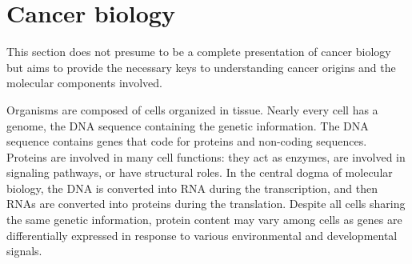 \documentclass[../main.tex]{subfiles}
\begin{document}
\section{Cancer biology}
	This section does not presume to be a complete presentation of cancer biology but aims to provide the necessary keys to understanding cancer origins and the molecular components involved.

	Organisms are composed of cells organized in tissue.
	Nearly every cell has a genome, the DNA sequence containing the genetic information.
	The DNA sequence contains genes that code for proteins and non-coding sequences.
	Proteins are involved in many cell functions: they act as enzymes, are involved in signaling pathways, or have structural roles.
	In the central dogma of molecular biology, the DNA is converted into RNA  during the transcription, and then RNAs are converted into proteins during the translation.
	Despite all cells sharing the same genetic information, protein content may vary among cells as genes are differentially expressed in response to various environmental and developmental signals.
\end{document}
